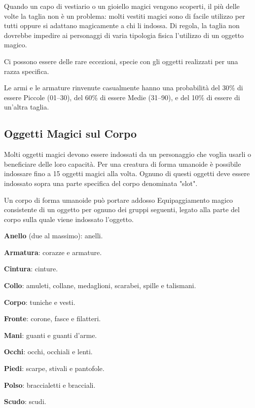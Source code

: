 \documentclass[a4paper,11pt,twoside,openany]{book}
\begin{document}
{\label{taglia-e-oggetti-magici}

Quando un capo di vestiario o un gioiello magici vengono scoperti, il più delle volte la taglia non è un problema: molti vestiti magici sono di facile utilizzo per tutti oppure si adattano magicamente a chi li indossa. Di regola, la taglia non dovrebbe impedire ai personaggi di varia tipologia fisica l'utilizzo di un oggetto magico. 

Ci possono essere delle rare eccezioni, specie con gli oggetti realizzati per una razza specifica.

Le armi e le armature rinvenute casualmente hanno una probabilità del 30\% di essere Piccole (01--30), del 60\% di essere Medie (31--90), e del 10\% di essere di un'altra taglia.

\subsection{Oggetti Magici sul Corpo}

\label{oggetti-magici-sul-corpo}

Molti oggetti magici devono essere indossati da un personaggio che voglia usarli o beneficiare delle loro capacità. Per una creatura di forma umanoide è possibile indossare fino a 15 oggetti magici alla volta. Ognuno di questi oggetti deve essere indossato sopra una parte specifica del corpo denominata "slot".

Un corpo di forma umanoide può portare addosso Equipaggiamento magico consistente di un oggetto per ognuno dei gruppi seguenti, legato alla parte del corpo sulla quale viene indossato l'oggetto.

\textbf{Anello} (due al massimo): anelli.

\textbf{Armatura}: corazze e armature.

\textbf{Cintura}: cinture.

\textbf{Collo}: amuleti, collane, medaglioni, scarabei, spille e talismani.

\textbf{Corpo}: tuniche e vesti.

\textbf{Fronte}: corone, fasce e filatteri.

\textbf{Mani}: guanti e guanti d'arme.

\textbf{Occhi}: occhi, occhiali e lenti.

\textbf{Piedi}: scarpe, stivali e pantofole.

\textbf{Polso}: braccialetti e bracciali.

\textbf{Scudo}: scudi.

}
\end{document}

